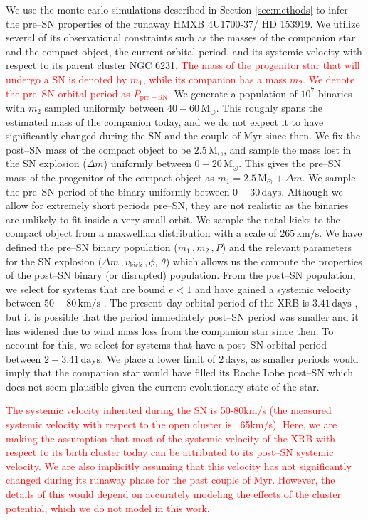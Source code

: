 \documentclass[linenumbers,trackchanges,twocolumn]{aastex701}
\newcommand{\Mdot}{\mathrm{M}_{\odot}}
\newcommand{\red}{\textcolor{red}}
\begin{document}
We use the monte carlo simulations described in Section \ref{sec:methods} to infer the pre--SN properties of the runaway HMXB 4U1700-37/ HD 153919. We utilize several of its observational constraints such as the masses of the companion star and the compact object, the current orbital period, and its systemic velocity with respect to its parent cluster NGC 6231. \red{The mass of the progenitor star that will undergo a SN is denoted by $m_1$, while its companion has a mass $m_2$. We denote the pre--SN orbital period as $P_{\mathrm{pre-SN}}$.} We generate a population of $10^7$ binaries with $m_2$ sampled uniformly between $40-60\,\Mdot$. This roughly spans the estimated mass of the companion today, and we do not expect it to have significantly changed during the SN and the couple of $\mathrm{Myr}$ since then. We fix the post--SN mass of the compact object to be $2.5 \, \Mdot$, and sample the mass lost in the SN explosion ($\Delta m$) uniformly between $0-20 \, \Mdot$. This gives the pre--SN mass of the progenitor of the compact object as $m_1 = 2.5\, \Mdot + \Delta m$. We sample the pre--SN period of the binary uniformly between $0-30\, \mathrm{days}$. Although we allow for extremely short periods pre--SN, they are not realistic as the binaries are unlikely to fit inside a very small orbit. We sample the natal kicks to the compact object from a maxwellian distribution with a scale of $265 \, \mathrm{km/s}$. We have defined the pre--SN binary population ($m_1\,, m_2\,, P$) and the relevant parameters for the SN explosion ($\Delta m\,, v_{\mathrm{kick}}\,, \phi,\, \theta$) which allows us the compute the properties of the post--SN binary (or disrupted) population. From the post--SN population, we select for systems that are bound $e<1$ and have gained a systemic velocity between $50-80 \, \mathrm{km/s}$ \citep{2021A&A...655A..31V}. The present--day orbital period of the XRB is $3.41 \, \mathrm{days}$ \citep{2016MNRAS.461..816I}, but it is possible that the period immediately post--SN period was smaller and it has widened due to wind mass loss from the companion star since then. To account for this, we select for systems that have a post--SN orbital period between $2-3.41 \, \mathrm{days}$. We place a lower limit of $2 \, \mathrm{days}$, as smaller periods would imply that the companion star would have filled its Roche Lobe post--SN which does not seem plausible given the current evolutionary state of the star. 

\red{The systemic velocity inherited during the SN is 50-80km/s (the measured systemic velocity with respect to the open cluster is ~65km/s). Here, we are making the assumption that most of the systemic velocity of the XRB with respect to its birth cluster today can be attributed to its post--SN systemic velocity. We are also implicitly assuming that this velocity has not significantly changed during its runaway phase for the past couple of Myr. However, the details of this would depend on accurately modeling the effects of the cluster potential, which we do not model in this work.}
\end{document}
